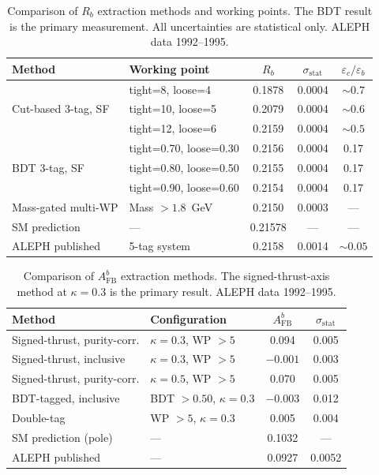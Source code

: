 \documentclass[11pt,a4paper]{article}
\begin{document}
\begin{table}[htbp]
\centering
\caption{Comparison of $R_b$ extraction methods and working points.
  The BDT result is the primary measurement.  All uncertainties are
  statistical only.  ALEPH data 1992--1995.}
\label{tbl:xcheck-rb}
\begin{tabular}{llccc}
\toprule
Method & Working point & $R_b$ & $\sigma_\mathrm{stat}$ & $\varepsilon_c/\varepsilon_b$ \\
\midrule
\multirow{3}{*}{Cut-based 3-tag, SF} & tight=8, loose=4 & 0.1878 & 0.0004 & $\sim 0.7$ \\
  & tight=10, loose=5 & 0.2079 & 0.0004 & $\sim 0.6$ \\
  & tight=12, loose=6 & 0.2159 & 0.0004 & $\sim 0.5$ \\
\midrule
\multirow{3}{*}{BDT 3-tag, SF} & tight=0.70, loose=0.30 & 0.2156 & 0.0004 & 0.17 \\
  & tight=0.80, loose=0.50 & 0.2155 & 0.0004 & 0.17 \\
  & tight=0.90, loose=0.60 & 0.2154 & 0.0004 & 0.17 \\
\midrule
Mass-gated multi-WP & Mass $> 1.8$~GeV & 0.2150 & 0.0003 & --- \\
\midrule
SM prediction & --- & 0.21578 & --- & --- \\
ALEPH published & 5-tag system & 0.2158 & 0.0014 & $\sim 0.05$ \\
\bottomrule
\end{tabular}
\end{table}

\begin{table}[htbp]
\centering
\caption{Comparison of $A_\mathrm{FB}^b$ extraction methods.  The
  signed-thrust-axis method at $\kappa = 0.3$ is the primary result.
  ALEPH data 1992--1995.}
\label{tbl:xcheck-afb}
\begin{tabular}{llcc}
\toprule
Method & Configuration & $A_\mathrm{FB}^b$ & $\sigma_\mathrm{stat}$ \\
\midrule
Signed-thrust, purity-corr. & $\kappa = 0.3$, WP $> 5$ & 0.094 & 0.005 \\
Signed-thrust, inclusive & $\kappa = 0.3$, WP $> 5$ & $-0.001$ & 0.003 \\
Signed-thrust, purity-corr. & $\kappa = 0.5$, WP $> 5$ & 0.070 & 0.005 \\
BDT-tagged, inclusive & BDT $> 0.50$, $\kappa = 0.3$ & $-0.003$ & 0.012 \\
Double-tag & WP $> 5$, $\kappa = 0.3$ & 0.005 & 0.004 \\
\midrule
SM prediction (pole) & --- & 0.1032 & --- \\
ALEPH published & --- & 0.0927 & 0.0052 \\
\bottomrule
\end{tabular}
\end{table}
\end{document}
